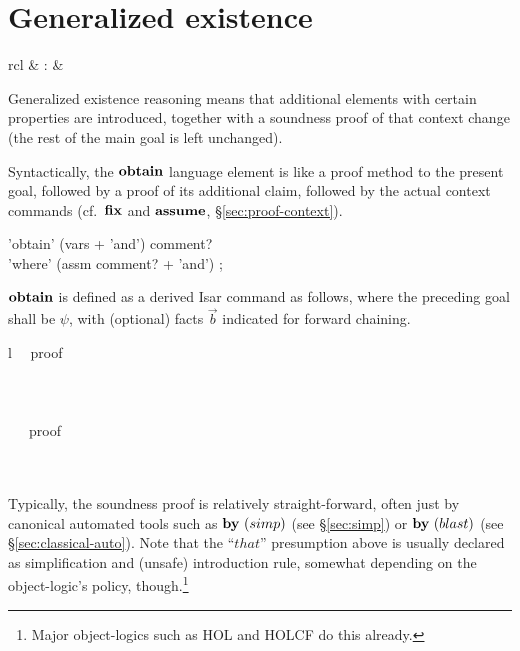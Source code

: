 \section{Generalized existence}

\begin{matharray}{rcl}
   & : &  \\
\end{matharray}

Generalized existence reasoning means that additional elements with certain
properties are introduced, together with a soundness proof of that context
change (the rest of the main goal is left unchanged).

Syntactically, the ${\mathord{\mathbf{obtain}}}$ language element is like a proof method to
the present goal, followed by a proof of its additional claim, followed by the
actual context commands (cf.\ ${\mathord{\mathbf{fix}}}$ and ${\mathord{\mathbf{assume}}}$,
\S\ref{sec:proof-context}).

\begin{rail}
  'obtain' (vars + 'and') comment? \\ 'where' (assm comment? + 'and')
  ;
\end{rail}

${\mathord{\mathbf{obtain}}}$ is defined as a derived Isar command as follows, where the
preceding goal shall be $\psi$, with (optional) facts $\vec b$ indicated for
forward chaining.
\begin{matharray}{l}
  ~~\langle proof\rangle \equiv {} \\[0.5ex]
  \quad {} \\
  \qquad {} \\
  \qquad {} \\
  \qquad {}~~~\langle proof\rangle \\
  \quad \NEXT \\
  \qquad {}~ \\
\end{matharray}

Typically, the soundness proof is relatively straight-forward, often just by
canonical automated tools such as $\BY{simp}$ (see \S\ref{sec:simp}) or
$\BY{blast}$ (see \S\ref{sec:classical-auto}).  Note that the ``$that$''
presumption above is usually declared as simplification and (unsafe)
introduction rule, somewhat depending on the object-logic's policy,
though.\footnote{Major object-logics such as HOL and HOLCF do this already.}


